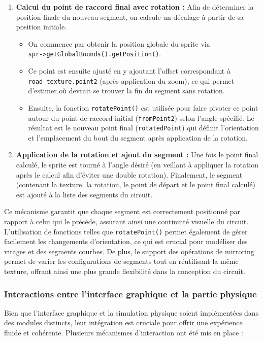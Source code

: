 \begin{enumerate}
    \item \textbf{Calcul du point de raccord final avec rotation :}
    Afin de déterminer la position finale du nouveau segment, on calcule un décalage à partir de sa position initiale.
    \begin{itemize}
        \item On commence par obtenir la position globale du \gls{sprite} via \\\texttt{spr->getGlobalBounds().getPosition()}.
        \item Ce point est ensuite ajusté en y ajoutant l'offset correspondant à \\\texttt{road\_texture.point2} (après application du zoom), ce qui permet d'estimer où devrait se trouver la fin du segment sans rotation.
        \item Ensuite, la fonction \texttt{rotatePoint()} est utilisée pour faire pivoter ce point autour du point de raccord initial (\texttt{fromPoint2}) selon l'angle spécifié.
        Le résultat est le nouveau point final (\texttt{rotatedPoint}) qui définit l'orientation et l'emplacement du bout du segment après application de la rotation.
    \end{itemize}

    \item \textbf{Application de la rotation et ajout du segment :}
    Une fois le point final calculé, le \gls{sprite} est tourné à l’angle désiré (en veillant à appliquer la rotation après le calcul afin d’éviter une double rotation).
    Finalement, le segment (contenant la texture, la rotation, le point de départ et le point final calculé) est ajouté à la liste des segments du circuit.
\end{enumerate}

Ce mécanisme garantit que chaque segment est correctement positionné par rapport à celui qui le précède, assurant ainsi une continuité visuelle du circuit.
L'utilisation de fonctions telles que \texttt{rotatePoint()} permet également de gérer facilement les changements d'orientation, ce qui est crucial pour modéliser des virages et des segments courbes.
De plus, le support des opérations de mirroring permet de varier les configurations de segments tout en réutilisant la même texture, offrant ainsi une plus grande flexibilité dans la conception du circuit.


\subsubsection{Interactions entre l'interface graphique et la partie physique}\label{subsubsec:interactions-entre-l-interface-graphique-et-la-partie-physique}
Bien que l'interface graphique et la simulation physique soient implémentées dans des modules distincts, leur intégration est cruciale pour offrir une expérience fluide et cohérente. Plusieurs mécanismes d'interaction ont été mis en place :

